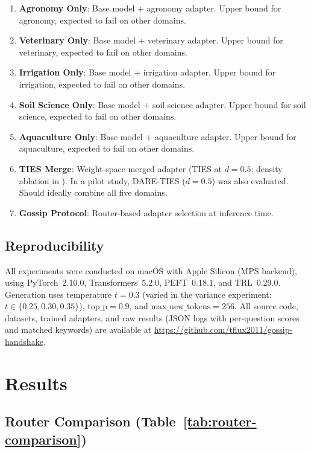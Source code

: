 \documentclass[conference, 10pt]{IEEEtran}
\begin{document}
\begin{enumerate}
    \item \textbf{Agronomy Only}: Base model + agronomy adapter.
          Upper bound for agronomy, expected to fail on other domains.
    \item \textbf{Veterinary Only}: Base model + veterinary adapter.
          Upper bound for veterinary, expected to fail on other domains.
    \item \textbf{Irrigation Only}: Base model + irrigation adapter.
          Upper bound for irrigation, expected to fail on other domains.
    \item \textbf{Soil Science Only}: Base model + soil science adapter.
          Upper bound for soil science, expected to fail on other domains.
    \item \textbf{Aquaculture Only}: Base model + aquaculture adapter.
          Upper bound for aquaculture, expected to fail on other domains.
    \item \textbf{TIES Merge}: Weight-space merged adapter (TIES at
          $d = 0.5$; density ablation in ).
          In a pilot study, DARE-TIES ($d = 0.5$) was also evaluated.
          Should ideally combine all five domains.
    \item \textbf{Gossip Protocol}: Router-based adapter selection at
          inference time.
\end{enumerate}

\subsection{Reproducibility}
All experiments were conducted on macOS with Apple Silicon (MPS backend),
using PyTorch~2.10.0, Transformers~5.2.0, PEFT~0.18.1, and TRL~0.29.0.
Generation uses temperature $t = 0.3$ (varied in the variance experiment:
$t \in \{0.25, 0.30, 0.35\}$), $\text{top\_p} = 0.9$, and
$\text{max\_new\_tokens} = 256$.
All source code, datasets, trained adapters, and raw results (JSON logs
with per-question scores and matched keywords) are available at
\url{https://github.com/tflux2011/gossip-handshake}.

\section{Results}
\label{sec:results}

\subsection{Router Comparison (Table~\ref{tab:router-comparison})}
\end{document}
